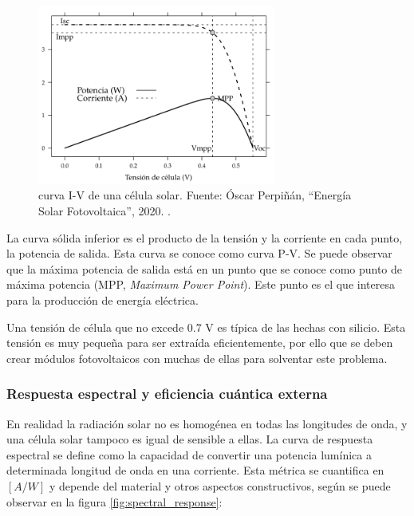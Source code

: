 \begin{figure}[H]
      \centering
      \includegraphics[width=0.7\textwidth]{./images/SoA_irrad/Solar_Cell_I-V_Curve_Schematic.png}
      \caption{\Gls{curva I-V} de una \gls{célula solar}. Fuente: Óscar Perpiñán, ``Energía Solar Fotovoltaica'', 2020. \cite[Fig. 4.6]{Perpinan2020}.}
      \label{fig:iv_curve}
\end{figure}

La curva sólida inferior es el producto de la tensión y la corriente en cada punto, la potencia de salida. Esta curva se conoce como \gls{curva P-V}. Se puede observar que la máxima potencia de salida está en un punto que se conoce como punto de máxima potencia (MPP, \textit{Maximum Power Point}). Este punto es el que interesa para la producción de energía eléctrica.

Una tensión de célula que no excede 0.7 V es típica de las hechas con silicio. Esta tensión es muy pequeña para ser extraída eficientemente, por ello que se deben crear módulos fotovoltaicos con muchas de ellas para solventar este problema.

\subsubsection{Respuesta espectral y eficiencia cuántica externa}

En realidad la \gls{radiación solar} no es homogénea en todas las longitudes de onda, y una \gls{célula solar} tampoco es igual de sensible a ellas. La curva de \gls{respuesta espectral} se define como la capacidad de convertir una potencia lumínica a determinada \gls{longitud de onda} en una corriente. Esta métrica se cuantifica en $[A/W]$ y depende del material y otros aspectos constructivos, según se puede observar en la figura \ref{fig:spectral_response}:

